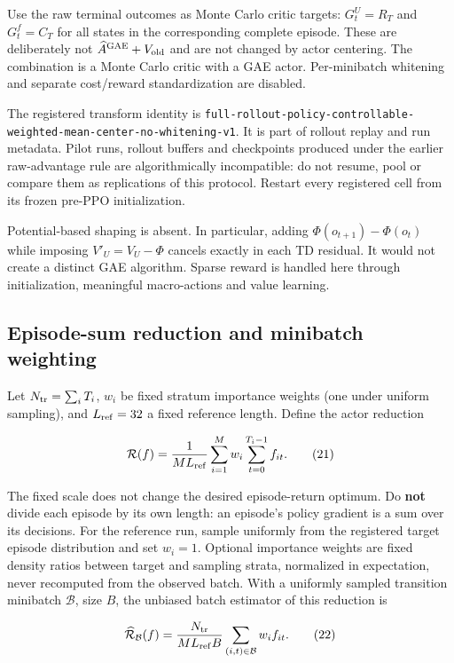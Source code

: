 \documentclass[10pt,a4paper]{article}
\begin{document}
Use the raw terminal outcomes as Monte Carlo critic targets:
\(G_t^U=R_T\) and \(G_t^f=C_T\) for all states in the corresponding
complete episode. These are deliberately not
\(\widehat A^{\rm GAE}+V_{\rm old}\) and are not changed by actor
centering. The combination is a Monte Carlo critic with a GAE actor.
Per-minibatch whitening and separate cost/reward standardization are
disabled.

The registered transform identity is
\texttt{full-rollout-policy-controllable-weighted-mean-center-no-whitening-v1}.
It is part of rollout replay and run metadata. Pilot runs, rollout buffers
and checkpoints produced under the earlier raw-advantage rule are
algorithmically incompatible: do not resume, pool or compare them as
replications of this protocol. Restart every registered cell from its
frozen pre-PPO initialization.

Potential-based shaping is absent. In particular, adding
\(\Phi(o_{t+1})-\Phi(o_t)\) while imposing \(V'_U=V_U-\Phi\) cancels
exactly in each TD residual. It would not create a distinct GAE
algorithm. Sparse reward is handled here through initialization,
meaningful macro-actions and value learning.

\hypertarget{episode-sum-reduction-and-minibatch-weighting}{%
\subsection{Episode-sum reduction and minibatch
weighting}\label{episode-sum-reduction-and-minibatch-weighting}}

Let \(N_{\rm tr}=\sum_iT_i\), \(w_i\) be fixed stratum importance
weights (one under uniform sampling), and \(L_{\rm ref}=32\) a fixed
reference length. Define the actor reduction

\[
\mathcal R(f)=\frac{1}{ML_{\rm ref}}
\sum_{i=1}^{M}w_i\sum_{t=0}^{T_i-1}f_{it}.
\tag{21}
\]

The fixed scale does not change the desired episode-return optimum. Do
\textbf{not} divide each episode by its own length: an episode's policy
gradient is a sum over its decisions. For the reference run, sample
uniformly from the registered target episode distribution and set
\(w_i=1\). Optional importance weights are fixed density ratios between
target and sampling strata, normalized in expectation, never recomputed
from the observed batch. With a uniformly sampled transition minibatch
\(\mathcal B\), size \(B\), the unbiased batch estimator of this
reduction is

\[
\widehat{\mathcal R}_{\mathcal B}(f)
=\frac{N_{\rm tr}}{ML_{\rm ref}B}
\sum_{(i,t)\in\mathcal B}w_i f_{it}.
\tag{22}
\]
\end{document}

